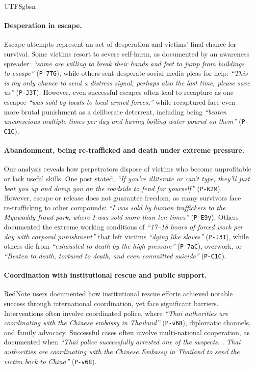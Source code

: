 \documentclass[sigconf,nonacm]{acmart}
\begin{document}
\begin{CJK}{UTF8}{gbsn}
\paragraph{\textbf{Desperation in escape.}} Escape attempts represent an act of desperation and victims' final chance for survival. Some victims resort to severe self-harm, as documented by an awareness spreader: \textit{``some are willing to break their hands and feet to jump from buildings to escape''} (\texttt{P-7TG}), while others sent desperate social media pleas for help: \textit{``This is my only chance to send a distress signal, perhaps also the last time, please save us''} (\texttt{P-J3T}). However, even successful escapes often lead to recapture as one escapee  \textit{``was sold by locals to local armed forces,''} while recaptured face even more brutal punishment as a deliberate deterrent, including being \textit{``beaten unconscious multiple times per day and having boiling water poured on them''} (\texttt{P-C1C}).

\paragraph{\textbf{Abandonment, being re-trafficked and death under extreme pressure.}} Our analysis reveals how perpetrators dispose of victims who become unprofitable or lack useful skills. One post stated, \textit{``If you're illiterate or can't type, they'll just beat you up and dump you on the roadside to fend for yourself''} (\texttt{P-K2M}). However, escape or release does not guarantee freedom, as many survivors face re-trafficking to other compounds: \textit{``I was sold by human traffickers to the Myawaddy fraud park, where I was sold more than ten times''} (\texttt{P-E9y}). Others documented the extreme working conditions of \textit{``17--18 hours of forced work per day with corporal punishment''} that left victims \textit{``dying like slaves''} (\texttt{P-J3T}), while others die from \textit{``exhausted to death by the high pressure''} (\texttt{P-7aC}), overwork, or \textit{``Beaten to death, tortured to death, and even committed suicide''} (\texttt{P-C1C}).

\paragraph{\textbf{Coordination with institutional rescue and public support.}} RedNote users documented how institutional rescue efforts achieved notable success through international coordination, yet face significant barriers. Interventions often involve coordinated police, where \textit{``Thai authorities are coordinating with the Chinese embassy in Thailand''} (\texttt{P-v68}), diplomatic channels, and family advocacy. Successful cases often involve multi-national cooperation, as documented when \textit{``Thai police successfully arrested one of the suspects... Thai authorities are coordinating with the Chinese Embassy in Thailand to send the victim back to China''} (\texttt{P-v68}). 


\end{CJK}
\end{document}
